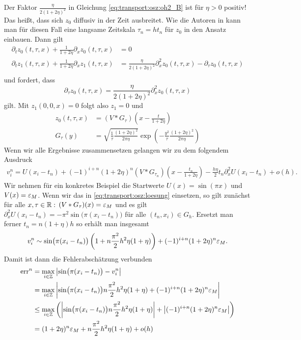 Der Faktor $\frac{\eta}{2 (1 + 2 \eta)^2}$ in Gleichung \eqref{eq:transport:osz:oh2_B} ist für $\eta > 0$ positiv!
Das heißt, dass sich $z_0$ diffusiv in der Zeit ausbreitet.
Wie die Autoren in \cite{Junk2004} kann man für diesen Fall eine langsame Zeitskala $\tau_n = h t_n$ für $z_0$ in den Ansatz einbauen.
Dann gilt
\begin{align*}
\partial_t z_0(t, \tau, x) + \frac {1} {1 + 2 \eta} \partial_x z_0(t, \tau, x) &= 0\\
\partial_t z_1(t, \tau, x) + \frac {1} {1 + 2 \eta} \partial_x z_1(t, \tau, x) &= \frac{\eta}{2 (1 + 2 \eta)^2} \partial^2_x z_0(t, \tau, x) - \partial_\tau z_0(t, \tau, x)\\
\end{align*}
und fordert, dass
\[ 
\partial_\tau z_0(t, \tau, x) = \frac{\eta}{2 (1 + 2 \eta)^2} \partial^2_x z_0(t, \tau, x) 
\]
gilt. Mit $z_1(0,0,x) = 0$ folgt also $z_1 = 0$ und
\begin{align*}
z_0(t, \tau, x) &= (V * G_\tau)\left(x - \frac{t}{1 + 2 \eta} \right) \\
G_\tau(y) &= \sqrt {\frac{1}{\tau} \frac {(1 + 2 \eta)^2}{2 \pi \eta}} \exp\left( - \frac{y^2}{\tau} \frac {(1 + 2 \eta)^2}{2 \pi \eta} \right)
\end{align*}
Wenn wir alle Ergebnisse zusammensetzen gelangen wir zu dem folgendem Ausdruck
\begin{align}\label{eq:transport:osz:loesung}
v^n_i = U(x_i - t_n) + (-1)^{i+n} (1+ 2 \eta)^n (V * G_{\tau_n})\left(x - \frac{t_n}{1 + 2 \eta} \right) - \frac{h\eta} 2 t_n \partial^2_x U(x_i - t_n) + o(h).
\end{align}
Wir nehmen für ein konkretes Beispiel die Startwerte $U(x) = \sin(\pi x)$ und $V(x) = \varepsilon_M$.
Wenn wir das in \eqref{eq:transport:osz:loesung} einsetzen, so gilt zunächst für alle $x, \tau \in \mathbb R:$ $(V * G_\tau)(x) = \varepsilon_M$ und es gilt $\partial^2_x U(x_i - t_n) = -\pi^2 \sin\bigl(\pi (x_i - t_n)\bigr)$ für alle $(t_n, x_i) \in G_h$.
Ersetzt man ferner $t_n = n (1+\eta) h$ so erhält man insgesamt
\begin{align}
v^n_i \sim \sin\bigl(\pi (x_i - t_n) \bigr)\left( 1 + n \frac {\pi^2} 2 h^2 \eta (1 + \eta) \right)  + (-1)^{i+n} (1 + 2 \eta)^n \varepsilon_M .
\end{align}
Damit ist dann die Fehlerabschätzung verbunden 
\begin{align}\label{eq:transport:osz:sinus_fehler}
\operatorname{err}^n &= \max_{i \in \mathbb Z} \left| \sin\bigl(\pi (x_i - t_n) \bigr) - v^n_i \right| \nonumber \\
&= \max_{i \in \mathbb Z} \left| \sin\bigl(\pi (x_i - t_n) \bigr) n \frac {\pi^2} 2 h^2 \eta (1 + \eta)  + (-1)^{i+n} (1 + 2 \eta)^n \varepsilon_M \right| \nonumber\\
&\leq \max_{i \in \mathbb Z} \left( \left| \sin\bigl(\pi (x_i - t_n) \bigr) n \frac {\pi^2} 2 h^2 \eta (1 + \eta) \right|  + \left| (-1)^{i+n} (1 + 2 \eta)^n \varepsilon_M \right| \right) \nonumber\\
&= (1 + 2 \eta)^n \varepsilon_M + n \frac {\pi^2} 2 h^2 \eta (1 + \eta) + o(h)
\end{align}
